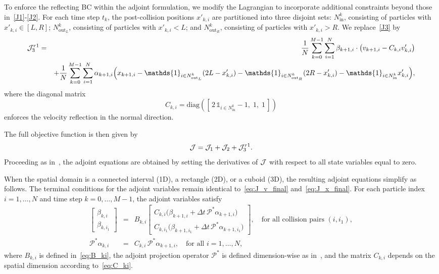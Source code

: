 \documentclass[12pt,nopreprintline]{elsarticle}
\begin{document}
To enforce the reflecting BC within the adjoint formulation, we modify the Lagrangian to incorporate additional constraints beyond those in~\eqref{J1}-\eqref{J2}. For each time step $t_k$, the post-collision positions $x'_{k,i}$ are partitioned into three disjoint sets: $N^k_{\mathrm{in}}$, consisting of particles with $x'_{k,i} \in [L,R]$; $N^k_{\mathrm{out}_L}$, consisting of particles with $x'_{k,i}<L$; and $N^k_{\mathrm{out}_R}$, consisting of particles with $x'_{k,i}>R$. We replace~\eqref{J3} by
\begin{eqnarray*}
\cJ_3^{r1} &=& \frac{1}{N} \sum_{k=0}^{M-1} \sum_{i=1}^N
\beta_{k+1,i} \cdot \bigl(v_{k+1,i} - C_{k,i} v'_{k,i}\bigr) \\
&& + \frac{1}{N} \sum_{k=0}^{M-1} \sum_{i=1}^N
\alpha_{k+1,i} \Bigl(x_{k+1,i}
- \mathds{1}_{i\in N^k_{\mathrm{out}_L}}(2L-x'_{k,i})
- \mathds{1}_{i\in N^k_{\mathrm{out}_R}}(2R-x'_{k,i})
- \mathds{1}_{i\in N^k_{\mathrm{in}}}x'_{k,i}\Bigr),
\label{eq:J3_R1}
\end{eqnarray*}
where the diagonal matrix
\begin{equation}\label{eq:C_ki}
C_{k,i} = \mathrm{diag}\!\left([\,2\,\mathds{1}_{i\in N^k_{\mathrm{in}}}-1,\;1,\;1\,]\right)
\end{equation}
enforces the velocity reflection in the normal direction.

The full objective function is then given by
\[
\mathcal J = \mathcal J_1 + \mathcal J_2 + \mathcal J_3^{r1}.
\]
Proceeding as in~, the adjoint equations are obtained by setting the derivatives of $\mathcal J$ with respect to all state variables equal to zero.

When the spatial domain is a connected interval (1D), a rectangle (2D), or a cuboid (3D), the resulting adjoint equations simplify as follows. The terminal conditions for the adjoint variables remain identical to~\eqref{eq:J_v_final} and~\eqref{eq:J_x_final}. For each particle index $i=1,\ldots,N$ and time step $k=0,\ldots,M-1$, the adjoint variables satisfy
\begin{eqnarray}
\begin{bmatrix}
\beta_{k,i} \\
\beta_{k,i_1}
\end{bmatrix}
&=&
B_{k,i}
\begin{bmatrix}
C_{k,i}\bigl(\beta_{k+1,i} + \Delta t\, \mathcal P^* \alpha_{k+1,i}\bigr) \\
C_{k,i_1}\bigl(\beta_{k+1,i_1} + \Delta t\, \mathcal P^* \alpha_{k+1,i_1}\bigr)
\end{bmatrix},
\quad \text{for all collision pairs $(i,i_1)$},
\label{eq:adjoint_gamma_R}\\
\mathcal P^* \alpha_{k,i}
&=&
C_{k,i}\,\mathcal P^* \alpha_{k+1,i},
\quad \text{for all } i=1,\ldots,N,
\label{eq:adjoint_alpha_R}
\end{eqnarray}
where $B_{k,i}$ is defined in~\eqref{eq:B_ki}, the adjoint projection operator $\mathcal P^*$ is defined dimension-wise as in~, and the matrix $C_{k,i}$ depends on the spatial dimension according to~\eqref{eq:C_ki}.
\end{document}
